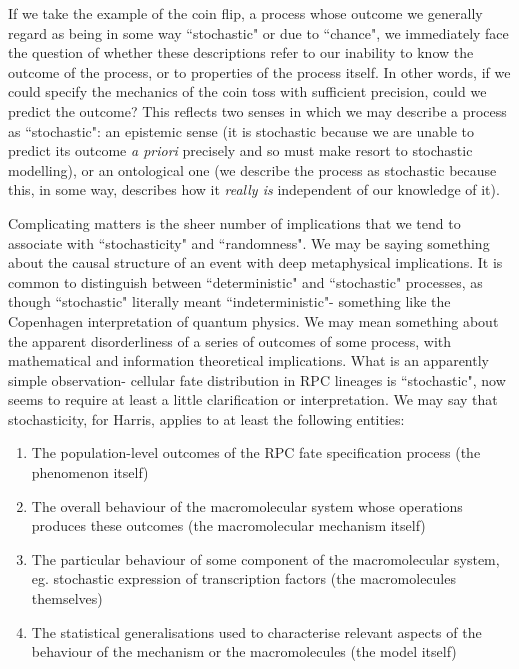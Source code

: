 \documentclass{ut-thesis}
\begin{document}
\begin{NoHyper}
If we take the example of the coin flip, a process whose outcome we generally regard as being in some way ``stochastic" or due to ``chance", we immediately face the question of whether these descriptions refer to our inability to know the outcome of the process, or to properties of the process itself. In other words, if we could specify the mechanics of the coin toss with sufficient precision, could we predict the outcome? This reflects two senses in which we may describe a process as ``stochastic": an epistemic sense (it is stochastic because we are unable to predict its outcome \textit{a priori} precisely and so must make resort to stochastic modelling), or an ontological one (we describe the process as stochastic because this, in some way, describes how it \textit{really is} independent of our knowledge of it).

Complicating matters is the sheer number of implications that we tend to associate with ``stochasticity" and ``randomness". We may be saying something about the causal structure of an event with deep metaphysical implications. It is common to distinguish between ``deterministic" and ``stochastic" processes, as though ``stochastic" literally meant ``indeterministic"- something like the Copenhagen interpretation of quantum physics. We may mean something about the apparent disorderliness of a series of outcomes of some process, with mathematical and information theoretical implications. What is an apparently simple observation- cellular fate distribution in RPC lineages is ``stochastic", now seems to require at least a little clarification or interpretation. We may say that stochasticity, for Harris, applies to at least the following entities:

\begin{enumerate}
\item The population-level outcomes of the RPC fate specification process (the phenomenon itself)
\item The overall behaviour of the macromolecular system whose operations produces these outcomes (the macromolecular mechanism itself)
\item The particular behaviour of some component of the macromolecular system, eg. stochastic expression of transcription factors (the macromolecules themselves)
\item The statistical generalisations used to characterise relevant aspects of the behaviour of the mechanism or the macromolecules (the model itself)
\end{enumerate}


\end{NoHyper}
\end{document}
